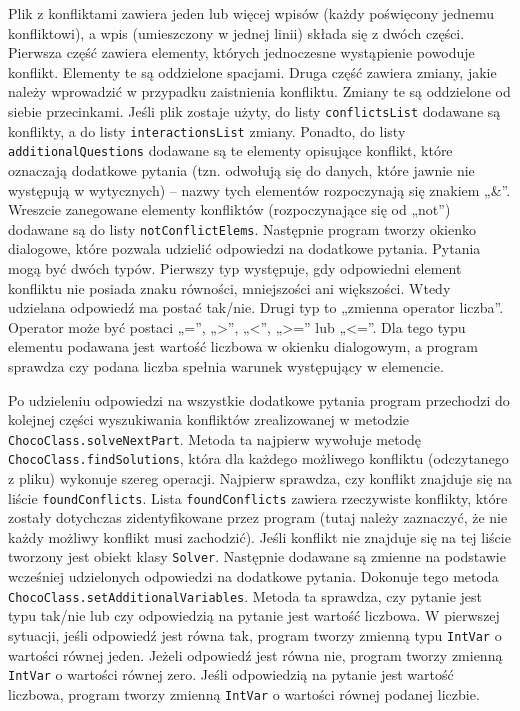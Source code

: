 Plik z konfliktami zawiera jeden lub więcej wpisów (każdy poświęcony jednemu konfliktowi), a wpis (umieszczony w jednej linii) składa się z dwóch części. Pierwsza część zawiera elementy, których jednoczesne wystąpienie powoduje konflikt. Elementy te są oddzielone spacjami. Druga część zawiera zmiany, jakie należy wprowadzić w przypadku zaistnienia konfliktu. Zmiany te są oddzielone od siebie przecinkami. 
Jeśli plik zostaje użyty, do listy \texttt{conflictsList} dodawane są konflikty, a do listy \texttt{interactionsList} zmiany. Ponadto, do listy \texttt{additionalQuestions} dodawane są te elementy opisujące konflikt, które oznaczają dodatkowe pytania (tzn. odwołują się do danych, które jawnie nie występują w wytycznych) -- nazwy tych elementów rozpoczynają się znakiem „\&”. Wreszcie zanegowane elementy konfliktów (rozpoczynające się od „not”) dodawane są do listy \texttt{notConflictElems}. Następnie program tworzy okienko dialogowe, które pozwala udzielić odpowiedzi na dodatkowe pytania. Pytania mogą być dwóch typów. Pierwszy typ występuje, gdy odpowiedni element konfliktu nie posiada znaku równości, mniejszości ani większości. Wtedy udzielana odpowiedź ma postać tak/nie. Drugi typ to „zmienna operator liczba”. Operator może być postaci „=”, „>”, „<”, „>=” lub „<=”. Dla tego typu elementu podawana jest wartość liczbowa w okienku dialogowym, a program sprawdza czy podana liczba spełnia warunek występujący w elemencie. 

Po udzieleniu odpowiedzi na wszystkie dodatkowe pytania program przechodzi do kolejnej części wyszukiwania konfliktów zrealizowanej w metodzie \texttt{ChocoClass.solveNextPart}. Metoda ta najpierw wywołuje metodę \texttt{ChocoClass.findSolutions}, która dla każdego możliwego konfliktu (odczytanego z pliku) wykonuje szereg operacji. Najpierw sprawdza, czy konflikt znajduje się na liście \texttt{foundConflicts}. Lista \texttt{foundConflicts} zawiera rzeczywiste konflikty, które zostały dotychczas zidentyfikowane przez program (tutaj należy zaznaczyć, że nie każdy możliwy konflikt musi zachodzić). Jeśli konflikt nie znajduje się na tej liście tworzony jest obiekt klasy \texttt{Solver}. Następnie dodawane są zmienne na podstawie wcześniej udzielonych odpowiedzi na dodatkowe pytania. Dokonuje tego metoda \texttt{ChocoClass.setAdditionalVariables}. Metoda ta sprawdza, czy pytanie jest typu tak/nie lub czy odpowiedzią na pytanie jest wartość liczbowa. W pierwszej sytuacji, jeśli odpowiedź jest równa tak, program tworzy zmienną typu \texttt{IntVar} o wartości równej jeden. Jeżeli odpowiedź jest równa nie, program tworzy zmienną \texttt{IntVar} o wartości równej zero. Jeśli odpowiedzią na pytanie jest wartość liczbowa, program tworzy zmienną \texttt{IntVar} o wartości równej podanej liczbie. 

